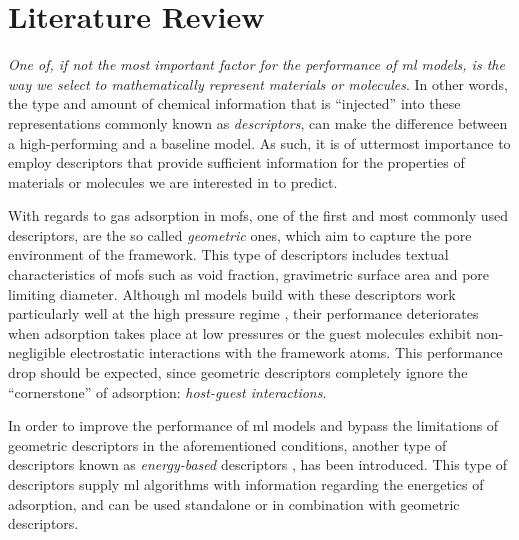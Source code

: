 \section{Literature Review}
\label{sec:literature}

\emph{One of, if not the most important factor for the performance of \gls{ml}
models, is the way we select to mathematically represent materials or
molecules}. In other words, the type and amount of chemical information that is
``injected'' into these representations commonly known as
\emph{descriptors}, can make the difference between a
high-performing and a baseline model. As such, it is of uttermost importance to
employ descriptors that provide sufficient information for the properties of
materials or molecules we are interested in to predict.

With regards to gas adsorption in \glspl{mof}, one of the
first and most commonly used descriptors, are the so called
\emph{geometric} ones, which aim to capture the
pore environment of the framework. This type of descriptors includes textual
characteristics of \glspl{mof} such as void fraction,
gravimetric surface area and pore limiting
diameter. Although \gls{ml} models build with
these descriptors work particularly well at the high pressure regime
\parencite{Fernandez2013, Wu2020, Dureckova_2019}, their performance
deteriorates when adsorption takes place at low pressures or the
guest molecules exhibit non-negligible electrostatic interactions with the
framework atoms. This performance drop should be expected, since geometric
descriptors completely ignore the ``cornerstone'' of adsorption:
\emph{host-guest interactions}.

In order to improve the performance of \gls{ml} models and bypass the
limitations of geometric descriptors in the aforementioned conditions, another
type of descriptors known as \emph{energy-based} descriptors  \parencite{chong127, Shi_2023, robust, Orhan2023}, has been
introduced. This type of descriptors supply \gls{ml} algorithms with information
regarding the energetics of adsorption, and can be used standalone or in
combination with geometric descriptors.

